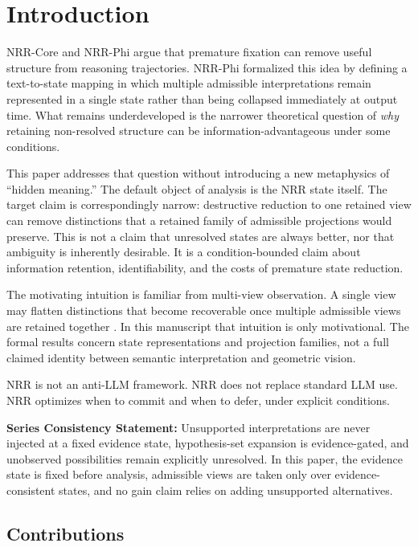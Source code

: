 \documentclass[11pt,a4paper]{article}
\begin{document}
\section{Introduction}
\label{sec:intro}

NRR-Core and NRR-Phi argue that premature fixation can remove useful structure from reasoning trajectories. NRR-Phi formalized this idea by defining a text-to-state mapping in which multiple admissible interpretations remain represented in a single state rather than being collapsed immediately at output time. What remains underdeveloped is the narrower theoretical question of \emph{why} retaining non-resolved structure can be information-advantageous under some conditions.

This paper addresses that question without introducing a new metaphysics of ``hidden meaning.'' The default object of analysis is the NRR state itself. The target claim is correspondingly narrow: destructive reduction to one retained view can remove distinctions that a retained family of admissible projections would preserve. This is not a claim that unresolved states are always better, nor that ambiguity is inherently desirable. It is a condition-bounded claim about information retention, identifiability, and the costs of premature state reduction.

The motivating intuition is familiar from multi-view observation. A single view may flatten distinctions that become recoverable once multiple admissible views are retained together \cite{hartley2004multiple}. In this manuscript that intuition is only motivational. The formal results concern state representations and projection families, not a full claimed identity between semantic interpretation and geometric vision.

NRR is not an anti-LLM framework.
NRR does not replace standard LLM use.
NRR optimizes when to commit and when to defer, under explicit conditions.

\textbf{Series Consistency Statement:}
Unsupported interpretations are never injected at a fixed evidence state, hypothesis-set expansion is evidence-gated, and unobserved possibilities remain explicitly unresolved. In this paper, the evidence state is fixed before analysis, admissible views are taken only over evidence-consistent states, and no gain claim relies on adding unsupported alternatives.

\subsection{Contributions}
\end{document}
